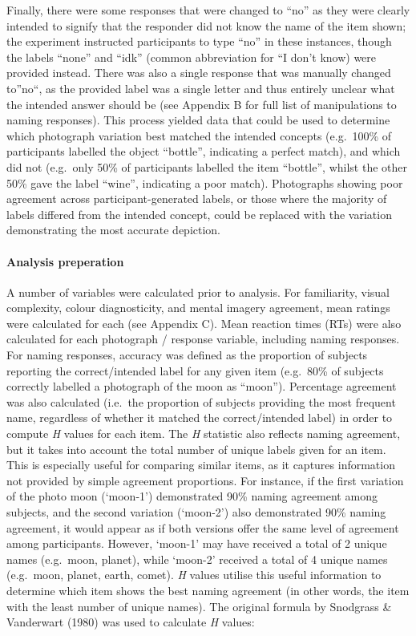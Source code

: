 \documentclass[
  11pt,
]{article}
\begin{document}
Finally, there were some responses that were changed to ``no'' as they
were clearly intended to signify that the responder did not know the
name of the item shown; the experiment instructed participants to type
``no'' in these instances, though the labels ``none'' and ``idk''
(common abbreviation for ``I don't know) were provided instead. There
was also a single response that was manually changed to''no``, as the
provided label was a single letter and thus entirely unclear what the
intended answer should be (see Appendix B for full list of manipulations
to naming responses). This process yielded data that could be used to
determine which photograph variation best matched the intended concepts
(e.g.~100\% of participants labelled the object ``bottle'', indicating a
perfect match), and which did not (e.g.~only 50\% of participants
labelled the item ``bottle'', whilst the other 50\% gave the label
``wine'', indicating a poor match). Photographs showing poor agreement
across participant-generated labels, or those where the majority of
labels differed from the intended concept, could be replaced with the
variation demonstrating the most accurate depiction.

\hypertarget{analysis-preperation}{%
\paragraph{Analysis preperation}\label{analysis-preperation}}

A number of variables were calculated prior to analysis. For
familiarity, visual complexity, colour diagnosticity, and mental imagery
agreement, mean ratings were calculated for each (see Appendix C). Mean
reaction times (RTs) were also calculated for each photograph / response
variable, including naming responses. For naming responses, accuracy was
defined as the proportion of subjects reporting the correct/intended
label for any given item (e.g.~80\% of subjects correctly labelled a
photograph of the moon as ``moon''). Percentage agreement was also
calculated (i.e.~the proportion of subjects providing the most frequent
name, regardless of whether it matched the correct/intended label) in
order to compute \emph{H} values for each item. The \emph{H} statistic
also reflects naming agreement, but it takes into account the total
number of unique labels given for an item. This is especially useful for
comparing similar items, as it captures information not provided by
simple agreement proportions. For instance, if the first variation of
the photo moon (`moon-1') demonstrated 90\% naming agreement among
subjects, and the second variation (`moon-2') also demonstrated 90\%
naming agreement, it would appear as if both versions offer the same
level of agreement among participants. However, `moon-1' may have
received a total of 2 unique names (e.g.~moon, planet), while `moon-2'
received a total of 4 unique names (e.g.~moon, planet, earth, comet).
\emph{H} values utilise this useful information to determine which item
shows the best naming agreement (in other words, the item with the least
number of unique names). The original formula by Snodgrass \& Vanderwart
(1980) was used to calculate \emph{H} values:
\end{document}
